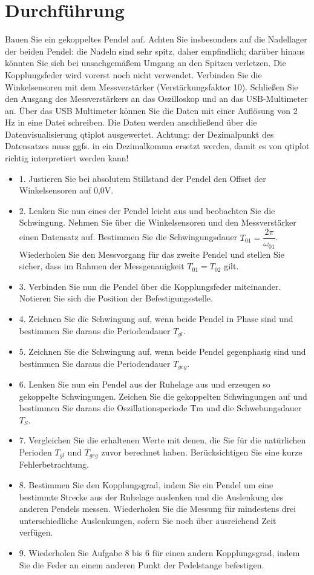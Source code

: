 \section{Durchführung}
Bauen Sie ein gekoppeltes Pendel auf. Achten Sie insbesonders auf die
Nadellager der beiden Pendel: die Nadeln sind sehr spitz, daher empfindlich; darüber hinaus könnten
Sie sich bei unsachgemäßem Umgang an den Spitzen verletzen.
Die Kopplungsfeder wird vorerst noch nicht verwendet.
Verbinden Sie die Winkelsensoren mit dem Messverstärker (Verstärkungsfaktor 10). Schließen Sie
den Ausgang des Messverstärkers an das Oszilloskop und an das USB-Multimeter an. Über das USB
Multimeter können Sie die Daten mit einer Auflösung von 2 Hz in eine Datei schreiben. Die Daten
werden anschließend über die Datenvisualisierung qtiplot ausgewertet.
Achtung: der Dezimalpunkt des Datensatzes muss ggfs. in ein Dezimalkomma ersetzt werden,
damit es von qtiplot richtig interpretiert werden kann!
\begin{itemize}
 \item 1. Justieren Sie bei absolutem Stillstand der Pendel den Offset der Winkelsensoren auf 0,0V.
 \item 2. Lenken Sie nun eines der Pendel leicht aus und beobachten Sie die Schwingung. Nehmen Sie über die Winkelsensoren und den Messverstärker einen Datensatz auf. Bestimmen Sie die Schwingungsdauer $T_{01} =\dfrac{2 \pi }{\omega_{01}}$. Wiederholen Sie den Messvorgang für das zweite Pendel und stellen Sie sicher, dass im Rahmen der Messgenauigkeit $T_{01}= T_{02} $ gilt.
 \item3. Verbinden Sie nun die Pendel über die Kopplungsfeder miteinander. Notieren Sie sich die Position der Befestigungsstelle.
 \item4. Zeichnen Sie die Schwingung auf, wenn beide Pendel in Phase sind und bestimmen Sie daraus die Periodendauer $T_{gl}$.
 \item5. Zeichnen Sie die Schwingung auf, wenn beide Pendel gegenphasig sind und bestimmen Sie daraus die Periodendauer $T_{geg}.$
 \item6. Lenken Sie nun ein Pendel aus der Ruhelage aus und erzeugen so gekoppelte Schwingungen.
 Zeichen Sie die gekoppelten Schwingungen auf und bestimmen Sie daraus die Oszillationsperiode Tm und die Schwebungsdauer $T_S.$
 \item7. Vergleichen Sie die erhaltenen Werte mit denen, die Sie für die natürlichen Perioden $T_{gl}$ und $T_{geg}$ zuvor berechnet haben. Berücksichtigen Sie eine kurze Fehlerbetrachtung.
 \item 8. Bestimmen Sie den Kopplungsgrad, indem Sie ein Pendel um eine bestimmte Strecke aus der
 Ruhelage auslenken und die Auslenkung des anderen Pendels messen. Wiederholen Sie die
 Messung für mindestens drei unterschiedliche Auslenkungen, sofern Sie noch über ausreichend
 Zeit verfügen.
 \item 9. Wiederholen Sie Aufgabe 8 bis 6 für einen andern Kopplungsgrad, indem Sie die Feder an
 einem anderen Punkt der Pedelstange befestigen.
\end{itemize}